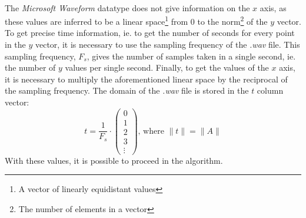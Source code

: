 \documentclass{article}
\providecommand{\norm}[1]{\lVert#1\rVert}
\begin{document}
\paragraph*{}
The \textit{Microsoft Waveform} datatype does not give information on the $x$
axis, as these values are inferred to be a linear space\footnote{A vector of
linearly equidistant values} from $0$ to the norm\footnote{The number of
elements in a vector} of the $y$ vector. To get precise time information, ie. to
get the number of seconds for every point in the $y$ vector, it is necessary to
use the sampling frequency of the \textit{.wav} file. This sampling frequency,
$F_s$, gives the number of samples taken in a single second, ie. the number of
$y$ values per single second.  Finally, to get the values of the $x$ axis, it is
necessary to multiply the aforementioned linear space by the reciprocal of the
sampling frequency. The domain of the \textit{.wav} file is stored in the $t$
column vector:
$$t = \frac{1}{F_s} \cdot
\begin{pmatrix}
	0 \\
	1 \\
	2 \\
	3 \\
	\vdots
\end{pmatrix}\text{, where $\norm{t} = \norm{A}$}
$$
With these values, it is possible to proceed in the algorithm.
\end{document}
